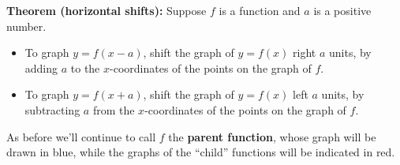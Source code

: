 \documentclass{ximera}
\begin{document}
\begin{callout}
  {\bf Theorem (horizontal shifts):} Suppose $f$ is a function and $a$ is a positive number.
  \begin{itemize}
  \item To graph $y = f(x-a)$, shift the graph of $y=f(x)$ right $a$ units, by adding $a$ to the $x$-coordinates of the points on the graph of $f$.
      \item To graph $y = f(x+a)$, shift the graph of $y=f(x)$ left $a$ units, by subtracting $a$ from the $x$-coordinates of the points on the graph of $f$.
  \end{itemize}
\end{callout}

As before we'll continue to call $f$ the {\bf parent function}, whose graph will be drawn in blue, while the graphs of the ``child'' functions will be indicated in red.
\end{document}
